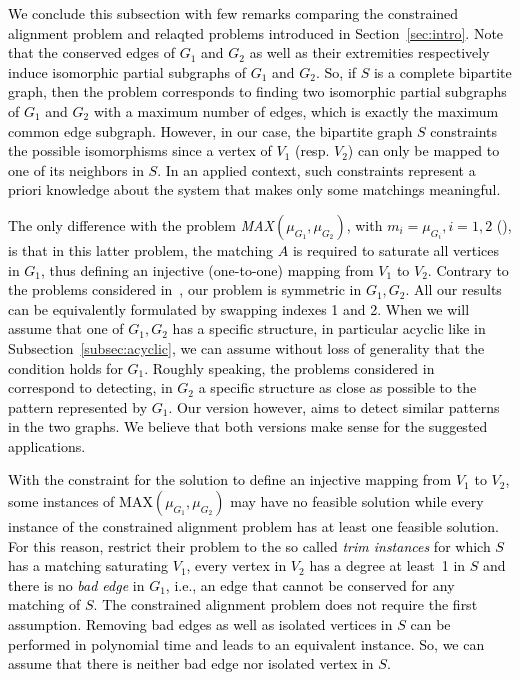 \documentclass[final]{dmtcs-episciences}
\newcommand\mar[1]{\textcolor{black}{#1}}
\begin{document}
\mar{We conclude this subsection with few remarks comparing the constrained alignment problem and relaqted problems introduced in Section~\ref{sec:intro}. Note that the conserved edges of $G_1$ and $G_2$ as well as their extremities respectively induce  isomorphic partial subgraphs of $G_1$ and  $G_2$. So, if $S$ is a complete bipartite graph, then the problem corresponds to finding two isomorphic partial subgraphs of $G_1$ and $G_2$ with a maximum number of edges, which is exactly the maximum common edge subgraph.} 
\mar{However, in our case, the bipartite graph $S$ constraints the possible  isomorphisms since a vertex of $V_1$ (resp. $V_2$) can only be mapped to one of its neighbors in $S$. In an applied context, such constraints represent a priori knowledge about the system that makes only some matchings meaningful.}

\mar{The only difference with the problem  \emph{ MAX}$(\mu_{G_1},\mu_{G_2})$,  with $m_i=\mu_{G_i}, i=1,2$ 
 (\citet{Fertin200990}), is that in this latter problem, the matching $A$ is required to saturate all vertices in $G_1$, thus defining an injective (one-to-one) mapping from $V_1$ to $V_2$. Contrary to the problems considered in~\citet{Fagnot2008,Fertin200990}, our problem is symmetric in $G_1,G_2$. All our results can be equivalently formulated by swapping indexes 1 and 2. When we will assume that one of $G_1,G_2$ has a specific structure, in particular acyclic like in Subsection~\ref{subsec:acyclic}, we can assume without loss of generality that the condition holds for $G_1$.  Roughly speaking, the problems considered in~\citet{Fagnot2008,Fertin200990} correspond to detecting, in $G_2$ a specific structure as close as possible to the pattern represented by $G_1$. Our version however,   aims to detect similar patterns in the two graphs. We believe that both versions make sense for the suggested  applications.}
 
 
 \mar{With the constraint for the solution to define an injective mapping from $V_1$ to $V_2$, some instances of {MAX}$(\mu_{G_1},\mu_{G_2})$ may have no feasible solution while every instance of the constrained alignment problem has at least one feasible solution. For this reason, \citet{Fertin200990} restrict their problem to the so called  \emph{ trim instances} for which $S$ has a matching saturating $V_1$, every vertex in $V_2$ has a degree at least~1 in $S$ and there is no  \emph{ bad edge} in $G_1$, i.e., an edge that cannot be conserved for any matching of $S$. The constrained alignment problem does not require  the first assumption. Removing bad edges as well as isolated vertices in $S$ can be performed in polynomial time and leads to an equivalent instance. So, we can assume that there is neither bad edge nor isolated vertex in $S$.} 
 
\end{document}
